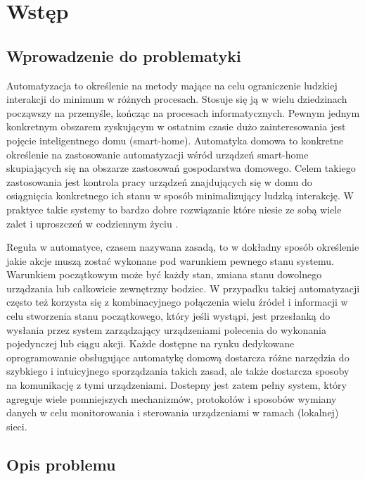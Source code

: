 
\chapter{Wstęp}

\section{Wprowadzenie do problematyki}

Automatyzacja to określenie na metody mające na celu ograniczenie ludzkiej interakcji do minimum w różnych procesach. Stosuje się ją w wielu dziedzinach począwszy na przemyśle, kończąc na procesach informatycznych. Pewnym jednym konkretnym obszarem zyskującym w ostatnim czasie dużo zainteresowania jest pojęcie inteligentnego domu (smart-home). Automatyka domowa to konkretne określenie na zastosowanie automatyzacji wśród urządzeń smart-home skupiających się na obszarze zastosowań gospodarstwa domowego. Celem takiego zastosowania jest kontrola pracy urządzeń znajdujących się w domu do osiągnięcia konkretnego ich stanu w sposób minimalizujący ludzką interakcję. W praktyce takie systemy to bardzo dobre rozwiązanie które niesie ze sobą wiele zalet i uproszczeń w codziennym życiu \cite{szablowski2019projektowanie}.

Reguła w automatyce, czasem nazywana zasadą, to w dokładny sposób określenie jakie akcje muszą zostać wykonane pod warunkiem pewnego stanu systemu. Warunkiem początkowym może być każdy stan, zmiana stanu dowolnego urządzania lub całkowicie zewnętrzny bodziec. W przypadku takiej automatyzacji często też korzysta się z kombinacyjnego połączenia wielu źródeł i informacji w celu stworzenia stanu początkowego, który jeśli wystąpi, jest przesłanką do wysłania przez system zarządzający urządzeniami polecenia do wykonania pojedynczej lub ciągu akcji. Każde dostępne na rynku dedykowane oprogramowanie obsługujące automatykę domową dostarcza różne narzędzia do szybkiego i intuicyjnego sporządzania takich zasad, ale także dostarcza sposoby na komunikację z tymi urządzeniami. Dostepny jest zatem pełny system, który agreguje wiele pomniejszych mechanizmów, protokołów i sposobów wymiany danych w celu monitorowania i sterowania urządzeniami w ramach (lokalnej) sieci.

\section{Opis problemu}

